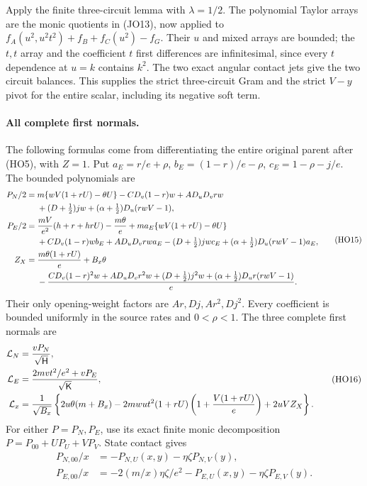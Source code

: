 Apply the finite three-circuit lemma with $\lambda=1/2$.
The polynomial Taylor arrays are the monic quotients in (JO13),
now applied to
$f_A(u^2,u^2t^2)+f_B+f_C(u^2)-f_G$.
Their $u$ and mixed arrays are bounded; the $t,t$ array and the
coefficient $t$ first differences are infinitesimal, since every
$t$ dependence at $u=k$ contains $k^2$.
The two exact angular contact jets give the two circuit balances.
This supplies the strict three-circuit Gram and the strict
$V-y$ pivot for the entire scalar, including its negative soft term.

\paragraph{All complete first normals.}
The following formulas come from differentiating the entire original
parent after (HO5), with $Z=1$. Put
$a_E=r/e+\rho$, $b_E=(1-r)/e-\rho$,
$c_E=1-\rho-j/e$. The bounded polynomials are
\[
 \begin{aligned}
 P_N/2={}&m\{wV(1+rU)-\theta U\}
 -CD_v(1-r)w+AD_uD_vrw\\
 &+(D+\tfrac12)jw
             +(\alpha+\tfrac12)D_u(rwV-1),\\
 P_E/2={}&{mV\over e^2}(h+r+hrU)-{m\theta\over e}
 +ma_E\{wV(1+rU)-\theta U\}\\
 &+CD_v(1-r)wb_E+AD_uD_vrwa_E
 -(D+\tfrac12)jwc_E
            +(\alpha+\tfrac12)D_u(rwV-1)a_E,\\
 Z_X={}&{m\theta(1+rU)\over e}+B_x\theta\\
 &-{CD_v(1-r)^2w+AD_uD_vr^2w+(D+\tfrac12)j^2w
                 +(\alpha+\tfrac12)D_ur(rwV-1)\over e}.
 \end{aligned}
 \tag{HO15}
\]
Their only opening-weight factors are $Ar,Dj,Ar^2,Dj^2$.
Every coefficient is bounded uniformly in the source rates and
$0<\rho<1$. The three complete first normals are
\[
 \begin{aligned}
 \mathcal L_N&={vP_N\over\sqrt{\mathsf H}},\\
 \mathcal L_E&={2mvt^2/e^2+vP_E\over\sqrt{\mathsf K}},\\
 \mathcal L_x&={1\over\sqrt{B_x}}\left\{
 2u\theta(m+B_x)-2mwut^2(1+rU)
           \left(1+{V(1+rU)\over e}\right)+2uVZ_X\right\}.
 \end{aligned}
 \tag{HO16}
\]
For either $P=P_N,P_E$, use its exact finite monic decomposition
$P=P_{00}+UP_U+VP_V$.
State contact gives
\[
 \begin{aligned}
 P_{N,00}/x&=-P_{N,U}(x,y)-\eta\zeta P_{N,V}(y),\\
 P_{E,00}/x&=-2(m/x)\eta\zeta/e^2
                         -P_{E,U}(x,y)-\eta\zeta P_{E,V}(y).
 \end{aligned}
 \tag{HO17}
\]

